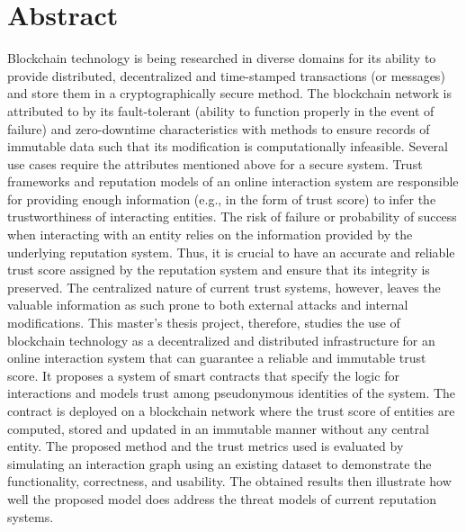 \chapter*{Abstract}
Blockchain technology is being researched in diverse domains for its ability to
provide distributed, decentralized and time-stamped transactions (or messages)
and store them in a cryptographically secure method. The blockchain network is
attributed to by its fault-tolerant (ability to function properly in the event
of failure) and zero-downtime characteristics with methods to ensure records of
immutable data such that its modification is computationally infeasible.
Several use cases require the attributes mentioned above for a secure system.
Trust frameworks and reputation models of an online interaction system are
responsible for providing enough information (e.g., in the form of trust score)
to infer the trustworthiness of interacting entities. The risk of failure or
probability of success when interacting with an entity relies on the
information provided by the underlying reputation system. Thus, it is crucial
to have an accurate and reliable trust score assigned by the reputation system
and ensure that its integrity is preserved. The centralized nature of current
trust systems, however, leaves the valuable information as such prone to both
external attacks and internal modifications. This master's thesis project,
therefore, studies the use of blockchain technology as a decentralized and
distributed infrastructure for an online interaction system that can guarantee
a reliable and immutable trust score. It proposes a system of smart contracts
that specify the logic for interactions and models trust among pseudonymous
identities of the system. The contract is deployed on a blockchain network
where the trust score of entities are computed, stored and updated in an
immutable manner without any central entity. The proposed method and the trust
metrics used is evaluated by simulating an interaction graph using an existing
dataset to demonstrate the functionality, correctness, and usability. The
obtained results then illustrate how well the proposed model does address the
threat models of current reputation systems.


